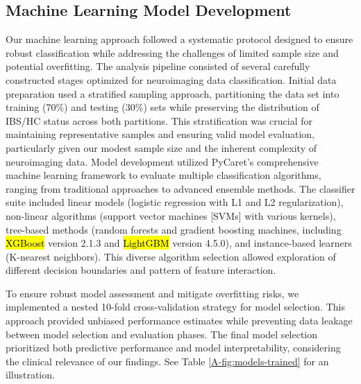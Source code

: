 \documentclass[diagnostics,article,accept,pdftex,moreauthors]{Definitions/mdpi}
\begin{document}
\subsection{Machine Learning Model Development}
Our machine learning approach followed a systematic protocol designed to ensure robust classification while addressing the challenges of limited sample size and potential overfitting. The analysis pipeline consisted of several carefully constructed stages optimized for neuroimaging data classification. Initial data preparation used a stratified sampling approach, partitioning the data set into training (70\%) and testing (30\%) sets while preserving the distribution of IBS/HC status across both partitions. This stratification was crucial for maintaining representative samples and ensuring valid model evaluation, particularly given our modest sample size and the inherent complexity of neuroimaging data. Model development utilized PyCaret's comprehensive machine learning framework to evaluate multiple classification algorithms, ranging from traditional approaches to advanced ensemble methods. The classifier suite included linear models (logistic regression with L1 and L2 regularization), non-linear algorithms (support vector machines [SVMs] with various kernels), tree-based methods (random forests and gradient boosting machines, including \hl{XGBoost} %
 \cite{chen2016xgboost} version 2.1.3 and \hl{LightGBM} version 4.5.0), %
and instance-based learners (K-nearest neighbors). This diverse algorithm selection allowed exploration of different decision boundaries and pattern of feature interaction.

To ensure robust model assessment and mitigate overfitting risks, we implemented a nested 10-fold cross-validation strategy for model selection. This approach provided unbiased performance estimates while preventing data leakage between model selection and evaluation phases. The final model selection prioritized both predictive performance and model interpretability, considering the clinical relevance of our findings. See Table \ref{A-fig:models-trained} for an illustration. 
\end{document}
